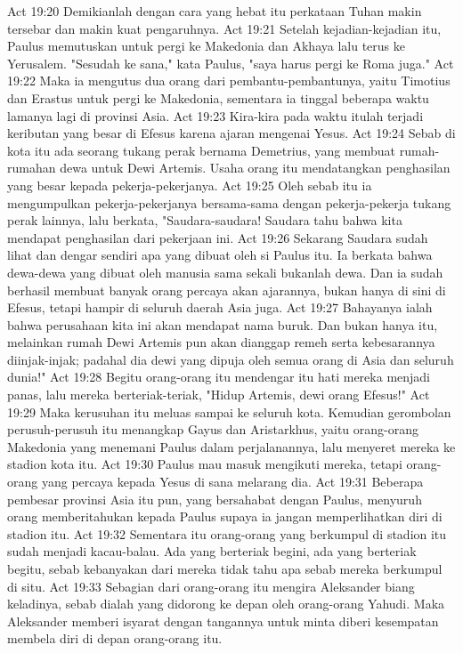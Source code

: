 Act 19:20  Demikianlah dengan cara yang hebat itu perkataan Tuhan makin tersebar dan makin kuat pengaruhnya.
Act 19:21  Setelah kejadian-kejadian itu, Paulus memutuskan untuk pergi ke Makedonia dan Akhaya lalu terus ke Yerusalem. "Sesudah ke sana," kata Paulus, "saya harus pergi ke Roma juga."
Act 19:22  Maka ia mengutus dua orang dari pembantu-pembantunya, yaitu Timotius dan Erastus untuk pergi ke Makedonia, sementara ia tinggal beberapa waktu lamanya lagi di provinsi Asia.
Act 19:23  Kira-kira pada waktu itulah terjadi keributan yang besar di Efesus karena ajaran mengenai Yesus.
Act 19:24  Sebab di kota itu ada seorang tukang perak bernama Demetrius, yang membuat rumah-rumahan dewa untuk Dewi Artemis. Usaha orang itu mendatangkan penghasilan yang besar kepada pekerja-pekerjanya.
Act 19:25  Oleh sebab itu ia mengumpulkan pekerja-pekerjanya bersama-sama dengan pekerja-pekerja tukang perak lainnya, lalu berkata, "Saudara-saudara! Saudara tahu bahwa kita mendapat penghasilan dari pekerjaan ini.
Act 19:26  Sekarang Saudara sudah lihat dan dengar sendiri apa yang dibuat oleh si Paulus itu. Ia berkata bahwa dewa-dewa yang dibuat oleh manusia sama sekali bukanlah dewa. Dan ia sudah berhasil membuat banyak orang percaya akan ajarannya, bukan hanya di sini di Efesus, tetapi hampir di seluruh daerah Asia juga.
Act 19:27  Bahayanya ialah bahwa perusahaan kita ini akan mendapat nama buruk. Dan bukan hanya itu, melainkan rumah Dewi Artemis pun akan dianggap remeh serta kebesarannya diinjak-injak; padahal dia dewi yang dipuja oleh semua orang di Asia dan seluruh dunia!"
Act 19:28  Begitu orang-orang itu mendengar itu hati mereka menjadi panas, lalu mereka berteriak-teriak, "Hidup Artemis, dewi orang Efesus!"
Act 19:29  Maka kerusuhan itu meluas sampai ke seluruh kota. Kemudian gerombolan perusuh-perusuh itu menangkap Gayus dan Aristarkhus, yaitu orang-orang Makedonia yang menemani Paulus dalam perjalanannya, lalu menyeret mereka ke stadion kota itu.
Act 19:30  Paulus mau masuk mengikuti mereka, tetapi orang-orang yang percaya kepada Yesus di sana melarang dia.
Act 19:31  Beberapa pembesar provinsi Asia itu pun, yang bersahabat dengan Paulus, menyuruh orang memberitahukan kepada Paulus supaya ia jangan memperlihatkan diri di stadion itu.
Act 19:32  Sementara itu orang-orang yang berkumpul di stadion itu sudah menjadi kacau-balau. Ada yang berteriak begini, ada yang berteriak begitu, sebab kebanyakan dari mereka tidak tahu apa sebab mereka berkumpul di situ.
Act 19:33  Sebagian dari orang-orang itu mengira Aleksander biang keladinya, sebab dialah yang didorong ke depan oleh orang-orang Yahudi. Maka Aleksander memberi isyarat dengan tangannya untuk minta diberi kesempatan membela diri di depan orang-orang itu.
